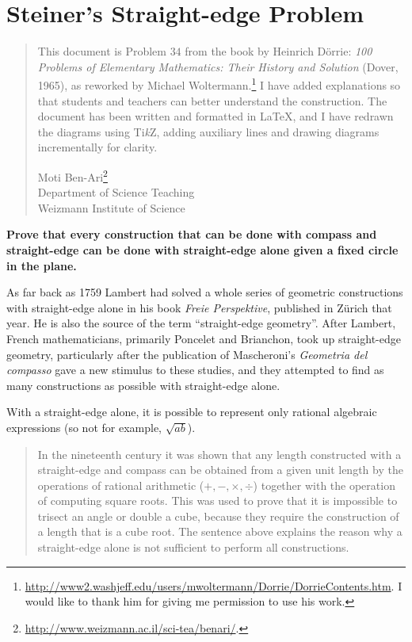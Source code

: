 
\chapter{Steiner's Straight-edge Problem}\label{c.chapter}

\begin{quote}
This document is Problem $34$ from the book by Heinrich D\"{o}rrie: \textit{100 Problems of Elementary Mathematics: Their History and Solution} (Dover, 1965), as reworked by Michael Woltermann.\footnote{\url{http://www2.washjeff.edu/users/mwoltermann/Dorrie/DorrieContents.htm}. I would like to thank him for giving me permission to use his work.} I have added explanations so that students and teachers can better understand the construction. The document has been written and formatted in \LaTeX{}, and I have redrawn the diagrams using Ti\textit{k}Z, adding auxiliary lines and  drawing diagrams incrementally for clarity.

Moti Ben-Ari\footnote{\url{http://www.weizmann.ac.il/sci-tea/benari/}.}\\
Department of Science Teaching\\
Weizmann Institute of Science
\end{quote}

\bigskip

\textbf{Prove that every construction that can be done with compass and straight-edge can be done with straight-edge alone given a fixed circle in the plane.}

As far back as 1759 Lambert had solved a whole series of geometric constructions with straight-edge alone in his book \textit{Freie Perspektive}, published in Z\"{u}rich that year. He is also the source of the term ``straight-edge geometry''. After Lambert, French mathematicians, primarily Poncelet and Brianchon, took up straight-edge geometry, particularly after the publication of Mascheroni's \textit{Geometria del compasso} gave a new stimulus to these studies, and they attempted to find as many constructions as possible with straight-edge alone. 

With a straight-edge alone, it is possible to represent only rational algebraic expressions (so not for example, $\sqrt{ab}$).
\begin{quote}
In the nineteenth century it was shown that any length constructed with a straight-edge and compass can be obtained from a given unit length by the operations of rational arithmetic ($+,-,\times,\div$) together with the operation of computing square roots. This was used to prove that it is impossible to trisect an angle or double a cube, because they require the construction of a length that is a cube root. The sentence above explains the reason why a straight-edge alone is not sufficient to perform all constructions. 
\end{quote}

